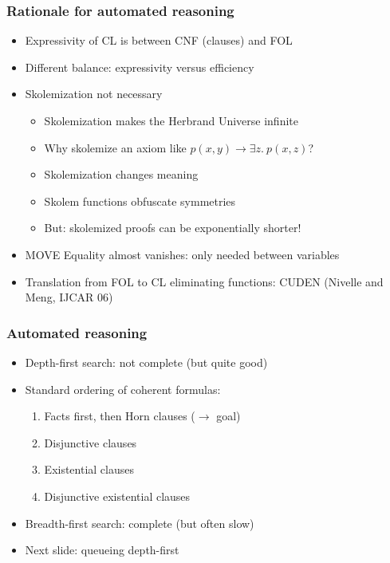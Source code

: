 \documentclass[handout,11pt]{beamer}
\newcommand{\weg}[1]{}
\begin{document}
\begin{frame}
\frametitle{Rationale for automated reasoning}
 \begin{itemize}[<+->] %
    \item Expressivity of CL is between CNF (clauses) and FOL
    \item Different balance: expressivity versus efficiency
    \item Skolemization not necessary
    \begin{itemize}
       \item Skolemization makes the Herbrand Universe infinite
       \item Why skolemize an axiom like $p(x,y)\to\exists z.~p(x,z)$?
       \item Skolemization changes meaning
       \item Skolem functions obfuscate symmetries
       \item \alert{But: skolemized proofs can be exponentially shorter!}
    \end{itemize}
       
   \item MOVE Equality almost vanishes: only needed between variables
   \item Translation from FOL to CL eliminating functions: CUDEN (Nivelle and Meng, IJCAR 06)
 \end{itemize}
\end{frame}

\weg{
\begin{frame}
\frametitle{Example: DP closed under reflexive closure}
\small
\end{frame}

\frame
  {    
    \frametitle{Search space} \vspace*{-.95in}
    \scalebox{0.40}
      {
    \texttt{[image: tree\_dpe]}
      }
  }
}%

\begin{frame}
\frametitle{Automated reasoning}
 \begin{itemize}[<+->]   %
    \item Depth-first search: not complete (but quite good)
    \item Standard ordering of coherent formulas:
    \begin{enumerate}
       \item Facts first, then Horn clauses ($\to$ goal)
       \item Disjunctive clauses
       \item Existential clauses
       \item Disjunctive existential clauses
    \end{enumerate}
    \item Breadth-first search: complete (but often slow)
    \item Next slide: queueing depth-first
 \end{itemize}
\end{frame}
\end{document}
